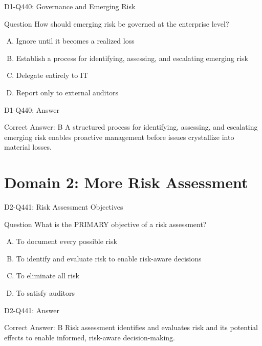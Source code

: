 \documentclass{beamer}
\begin{document}
\begin{frame}{D1-Q440: Governance and Emerging Risk}
	\begin{block}{Question}
		How should emerging risk be governed at the enterprise level?
	\end{block}
	\begin{enumerate}[(A)]
		\item Ignore until it becomes a realized loss
		\item Establish a process for identifying, assessing, and escalating emerging risk
		\item Delegate entirely to IT
		\item Report only to external auditors
	\end{enumerate}
\end{frame}
\begin{frame}{D1-Q440: Answer}
	\begin{block}{Correct Answer: B}
		A structured process for identifying, assessing, and escalating emerging risk enables proactive management before issues crystallize into material losses.
	\end{block}
\end{frame}

\section{Domain 2: More Risk Assessment}

\begin{frame}{D2-Q441: Risk Assessment Objectives}
	\begin{block}{Question}
		What is the PRIMARY objective of a risk assessment?
	\end{block}
	\begin{enumerate}[(A)]
		\item To document every possible risk
		\item To identify and evaluate risk to enable risk-aware decisions
		\item To eliminate all risk
		\item To satisfy auditors
	\end{enumerate}
\end{frame}
\begin{frame}{D2-Q441: Answer}
	\begin{block}{Correct Answer: B}
		Risk assessment identifies and evaluates risk and its potential effects to enable informed, risk-aware decision-making.
	\end{block}
\end{frame}
\end{document}
